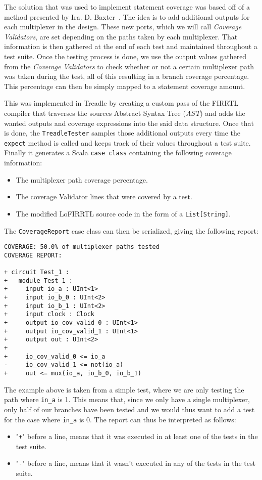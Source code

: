 \documentclass[conference]{IEEEtran}
\begin{document}
The solution that was used to implement statement coverage was based off of a method presented by Ira. D. Baxter~\cite{branch-cov-made-easy:2002}. The idea is to add additional outputs for each multiplexer in the design. These new ports, which we will call \textit{Coverage Validators}, are set depending on the paths taken by each multiplexer. That information is then gathered at the end of each test and maintained throughout a test suite. Once the testing process is done, we use the output values gathered from the \textit{Coverage Validators} to check whether or not a certain multiplexer path was taken during the test, all of this resulting in a branch coverage percentage. This percentage can then be simply mapped to a statement coverage amount.

This was implemented in Treadle by creating a custom pass of the FIRRTL compiler that traverses the sources Abstract Syntax Tree (\textit{AST}) and adds the wanted outputs and coverage expressions into the said data structure. Once that is done, the \texttt{TreadleTester} samples those additional outputs every time the \texttt{expect} method is called and keeps track of their values throughout a test suite. Finally it generates a Scala \texttt{case class} containing the following coverage information:
\begin{itemize}
\item The multiplexer path coverage percentage.
\item The coverage Validator lines that were covered by a test.
\item The modified LoFIRRTL source code in the form of a \texttt{List[String]}.
\end{itemize}
The \texttt{CoverageReport} case class can then be serialized, giving the following report:
\begin{verbatim}
COVERAGE: 50.0% of multiplexer paths tested
COVERAGE REPORT:

+ circuit Test_1 :
+   module Test_1 :
+     input io_a : UInt<1>
+     input io_b_0 : UInt<2>
+     input io_b_1 : UInt<2>
+     input clock : Clock
+     output io_cov_valid_0 : UInt<1>
+     output io_cov_valid_1 : UInt<1>
+     output out : UInt<2>
+   
+     io_cov_valid_0 <= io_a
-     io_cov_valid_1 <= not(io_a)
+     out <= mux(io_a, io_b_0, io_b_1)
\end{verbatim}
The example above is taken from a simple test, where we are only testing the path where \texttt{in\_a} is 1. This means that, since we only have a single multiplexer, only half of our branches have been tested and we would thus want to add a test for the case where \texttt{in\_a} is 0. The report can thus be interpreted as follows:  
\begin{itemize}
\item "\texttt{+}" before a line, means that it was executed in at least one of the tests in the test suite.
\item "\texttt{-}" before a line, means that it wasn't executed in any of the tests in the test suite.
\end{itemize}
\end{document}
